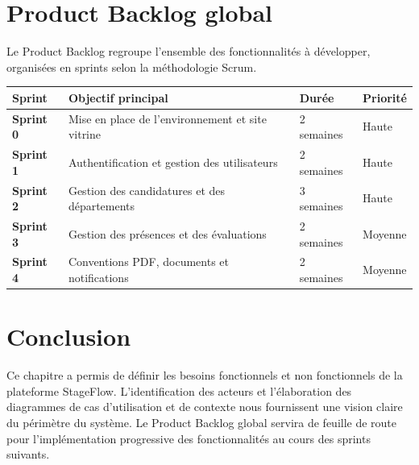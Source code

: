 \section{Product Backlog global}
Le Product Backlog regroupe l'ensemble des fonctionnalités à développer, organisées en sprints selon la méthodologie Scrum.

\begin{center}
\begin{tabular}{|l|p{6cm}|p{2cm}|p{3cm}|}
\hline
\textbf{Sprint} & \textbf{Objectif principal} & \textbf{Durée} & \textbf{Priorité} \\ \hline
\textbf{Sprint 0} & Mise en place de l'environnement et site vitrine & 2 semaines & Haute \\ \hline
\textbf{Sprint 1} & Authentification et gestion des utilisateurs & 2 semaines & Haute \\ \hline
\textbf{Sprint 2} & Gestion des candidatures et des départements & 3 semaines & Haute \\ \hline
\textbf{Sprint 3} & Gestion des présences et des évaluations & 2 semaines & Moyenne \\ \hline
\textbf{Sprint 4} & Conventions PDF, documents et notifications & 2 semaines & Moyenne \\ \hline
\end{tabular}
\end{center}

\section{Conclusion}
Ce chapitre a permis de définir les besoins fonctionnels et non fonctionnels de la plateforme StageFlow. L'identification des acteurs et l'élaboration des diagrammes de cas d'utilisation et de contexte nous fournissent une vision claire du périmètre du système. Le Product Backlog global servira de feuille de route pour l'implémentation progressive des fonctionnalités au cours des sprints suivants.
